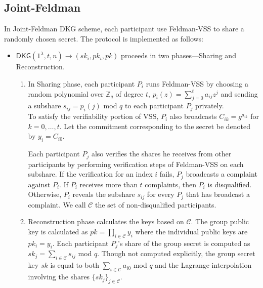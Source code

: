 \documentclass[letterpaper,twocolumn,10pt]{article}
\theoremstyle{definition}
\theoremstyle{remark}
\begin{document}
\subsection{Joint-Feldman}
\label{appendix:jointFeldman}
In Joint-Feldman DKG scheme, each participant use Feldman-VSS to share a randomly chosen secret. The protocol is implemented as follows:
\begin{itemize}
    \item $\mathsf{DKG}(1^\lambda, t, n) \rightarrow (sk_i, pk_i, pk)$ proceeds in two phases---Sharing and Reconstruction.
    \begin{enumerate}
        \item In Sharing phase, each participant $P_i$ runs Feldman-VSS by choosing a random polynomial over $\mathbb{Z}_q$ of degree $t$, $p_i(z) = \sum_{j = 0}^{t} a_{ij} z^j$ and sending a subshare $s_{ij} = p_i(j)$ mod $q$ to each participant $P_j$ privately. \\
        To satisfy the verifiability portion of VSS, $P_i$ also broadcasts $C_{ik} = g^{a_{ik}}$ for $k = 0, \ldots, t$. Let the commitment corresponding to the secret be denoted by $y_i = C_{i0}$.
        
        Each participant $P_j$ also verifies the shares he receives from other participants by performing verification steps of Feldman-VSS on each subshare. If the verification for an index $i$ fails, $P_j$ broadcasts a complaint against $P_i$. If $P_i$ receives more than $t$ complaints, then $P_i$ is disqualified. Otherwise, $P_i$ reveals the subshare $s_{ij}$ for every $P_j$ that has broadcast a complaint. We call $\mathcal{C}$ the set of non-disqualified participants.
        
        \item Reconstruction phase calculates the keys based on $\mathcal{C}$.
        The group public key is calculated as $pk = \prod_{i \in \mathcal{C}} y_i$ where the individual public keys are $pk_i = y_i$. Each participant $P_j$'s share of the group secret is computed as $sk_j = \sum_{i \in \mathcal{C}} s_{ij}$ mod $q$. Though not computed explicitly, the group secret key $sk$ is equal to both $\sum_{i \in \mathcal{C}} a_{i0}$ mod $q$ and the Lagrange interpolation involving the shares $\{sk_j\}_{j \in \mathcal{C}}$.
    \end{enumerate}
\end{itemize}

\fi
\iffalse
\end{document}
